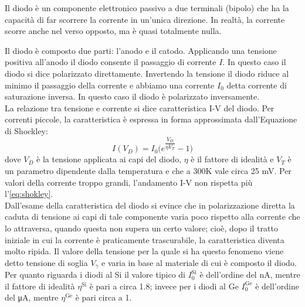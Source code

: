 Il diodo è un componente elettronico passivo a due terminali (bipolo) che ha la capacità di far scorrere la corrente in un'unica direzione. In realtà, la corrente scorre anche nel verso opposto, ma è quasi totalmente nulla.

Il diodo è composto due parti: l'anodo e il catodo. Applicando una tensione positiva all’anodo il diodo consente il passaggio di corrente $I$. In questo caso il diodo si dice polarizzato direttamente. Invertendo la tensione il diodo riduce al minimo il passaggio della corrente e abbiamo una corrente $I_0$ detta corrente di saturazione inversa. In questo caso il diodo è polarizzato inversamente.\\
La relazione tra tensione e corrente si dice caratteristica I-V del diodo. Per correnti piccole, la caratteristica è espressa in forma approssimata dall'Equazione di Shockley:
\begin{equation} \label{eq:shokley}
    I(V_D) = \displaystyle I_0\Biggl(e^{\dfrac{V_D}{\eta V_T}} - 1 \Biggl)
\end{equation}
dove $V_D$ è la tensione applicata ai capi del diodo, $\eta$ è il fattore di idealità e $V_T$ è un parametro dipendente dalla temperatura e che a 300\si{\kelvin} vale circa 25 \si{\milli\volt}. Per valori della corrente troppo grandi, l’andamento I-V non rispetta più l'\autoref{eq:shokley}.\\
Dall’esame della caratteristica del diodo si evince che in polarizzazione diretta la caduta di tensione ai capi di tale componente varia poco rispetto alla corrente che lo attraversa, quando questa non supera un certo valore; cioè, dopo il tratto iniziale in cui la corrente è praticamente trascurabile, la caratteristica diventa molto ripida. Il valore della tensione per la quale si ha questo fenomeno viene detto tensione di soglia $V_\gamma$ e varia in base al materiale di cui è composto il diodo.\\
Per quanto riguarda i diodi al Si il valore tipico di $I_0^\text{Si}$ è dell’ordine del \si{\nano\ampere}, mentre il fattore di idealità $\eta^\text{Si}$ è pari a circa 1.8; invece per i diodi al Ge $I_0^\text{Ge}$ è dell’ordine del \si{\micro\ampere}, mentre $\eta^\text{Ge}$ è pari circa a 1.